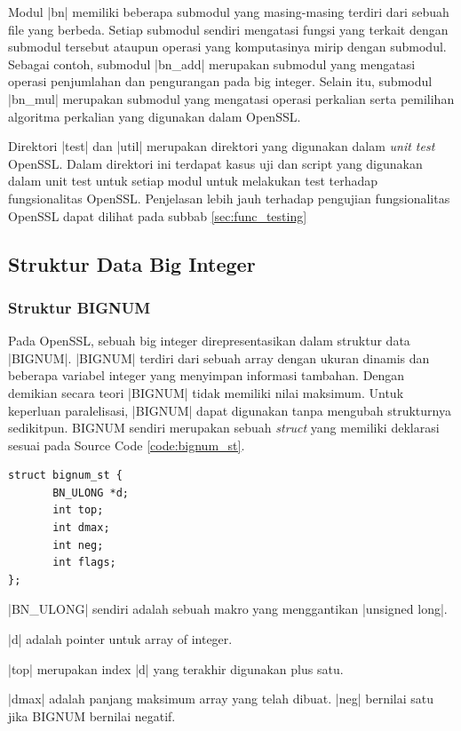     Modul |bn| memiliki beberapa submodul yang masing-masing terdiri dari sebuah file yang berbeda. Setiap submodul sendiri mengatasi fungsi yang terkait dengan submodul tersebut ataupun operasi yang komputasinya mirip dengan submodul. Sebagai contoh, submodul |bn_add| merupakan submodul yang mengatasi operasi penjumlahan dan pengurangan pada big integer. Selain itu, submodul |bn_mul| merupakan submodul yang mengatasi operasi perkalian serta pemilihan algoritma perkalian yang digunakan dalam OpenSSL.

    Direktori |test| dan |util| merupakan direktori yang digunakan dalam \textit{unit test} OpenSSL. Dalam direktori ini terdapat kasus uji dan script yang digunakan dalam unit test untuk setiap modul untuk melakukan test terhadap fungsionalitas OpenSSL. Penjelasan lebih jauh terhadap pengujian fungsionalitas OpenSSL dapat dilihat pada subbab \ref{sec:func_testing}

  \subsection{Struktur Data Big Integer} \label{sec:bignum_struct}
  \subsubsection{Struktur BIGNUM}

    Pada OpenSSL, sebuah big integer direpresentasikan dalam struktur data |BIGNUM|. |BIGNUM| terdiri dari sebuah array dengan ukuran dinamis dan beberapa variabel integer yang menyimpan informasi tambahan. Dengan demikian secara teori |BIGNUM| tidak memiliki nilai maksimum. Untuk keperluan paralelisasi, |BIGNUM| dapat digunakan tanpa mengubah strukturnya sedikitpun. BIGNUM sendiri merupakan sebuah \textit{struct} yang memiliki deklarasi sesuai pada Source Code \ref{code:bignum_st}.

    \begin{lstlisting}[caption={Struktur Data bignum}, label={code:bignum_st}]
struct bignum_st {
       BN_ULONG *d;
       int top;
       int dmax;
       int neg;
       int flags;
};
    \end{lstlisting}

    |BN_ULONG| sendiri adalah sebuah makro yang menggantikan |unsigned long|.

    |d| adalah pointer untuk array of integer.

    |top| merupakan index |d| yang terakhir digunakan plus satu.

    |dmax| adalah panjang maksimum array yang telah dibuat. |neg| bernilai satu jika BIGNUM bernilai negatif.

